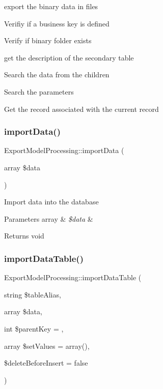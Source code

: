 export the binary data in files

Verifiy if a business key is defined

Verify if binary folder exists

get the description of the secondary table

Search the data from the children

Search the parameters

Get the record associated with the current record\mbox{\label{classExportModelProcessing_ab64c8d4090ae54eb8b3a55853810b014}} 
\subsubsection{\texorpdfstring{import\+Data()}{importData()}}
{\footnotesize\ttfamily Export\+Model\+Processing\+::import\+Data (\begin{DoxyParamCaption}\item[{array}]{\$data }\end{DoxyParamCaption})}

Import data into the database


\begin{DoxyParams}[1]{Parameters}
array & {\em \$data} & \\
\hline
\end{DoxyParams}
\begin{DoxyReturn}{Returns}
void 
\end{DoxyReturn}
\mbox{\label{classExportModelProcessing_a713672fd704e7044319586d7bda6e712}} 
\subsubsection{\texorpdfstring{import\+Data\+Table()}{importDataTable()}}
{\footnotesize\ttfamily Export\+Model\+Processing\+::import\+Data\+Table (\begin{DoxyParamCaption}\item[{string}]{\$table\+Alias,  }\item[{array}]{\$data,  }\item[{int}]{\$parent\+Key = {},  }\item[{array}]{\$set\+Values = {\ttfamily array()},  }\item[{}]{\$delete\+Before\+Insert = {\ttfamily false} }\end{DoxyParamCaption})}

